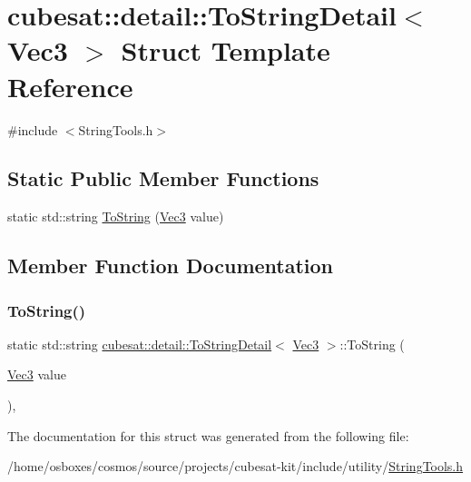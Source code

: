 \hypertarget{structcubesat_1_1detail_1_1ToStringDetail_3_01Vec3_01_4}{}\section{cubesat\+:\+:detail\+:\+:To\+String\+Detail$<$ Vec3 $>$ Struct Template Reference}
\label{structcubesat_1_1detail_1_1ToStringDetail_3_01Vec3_01_4}


{\ttfamily \#include $<$String\+Tools.\+h$>$}

\subsection*{Static Public Member Functions}
\begin{DoxyCompactItemize}
\item 
static std\+::string \hyperlink{structcubesat_1_1detail_1_1ToStringDetail_3_01Vec3_01_4_a1da2b4984504a5da410e384860c88d4d}{To\+String} (\hyperlink{structcubesat_1_1Vec3}{Vec3} value)
\end{DoxyCompactItemize}


\subsection{Member Function Documentation}
\mbox{\label{structcubesat_1_1detail_1_1ToStringDetail_3_01Vec3_01_4_a1da2b4984504a5da410e384860c88d4d}} 
\subsubsection{\texorpdfstring{To\+String()}{ToString()}}
{\footnotesize\ttfamily static std\+::string \hyperlink{structcubesat_1_1detail_1_1ToStringDetail}{cubesat\+::detail\+::\+To\+String\+Detail}$<$ \hyperlink{structcubesat_1_1Vec3}{Vec3} $>$\+::To\+String (\begin{DoxyParamCaption}\item[{\hyperlink{structcubesat_1_1Vec3}{Vec3}}]{value }\end{DoxyParamCaption})\hspace{0.3cm}{\ttfamily [inline]}, {\ttfamily [static]}}



The documentation for this struct was generated from the following file\+:\begin{DoxyCompactItemize}
\item 
/home/osboxes/cosmos/source/projects/cubesat-\/kit/include/utility/\hyperlink{StringTools_8h}{String\+Tools.\+h}\end{DoxyCompactItemize}
